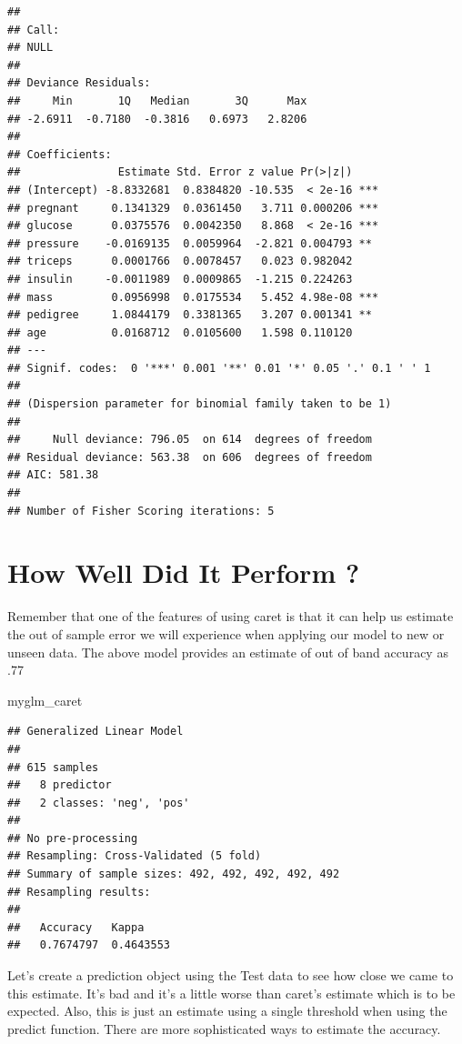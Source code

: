\documentclass[]{book}
\newenvironment{Shaded}{\begin{snugshade}}{\end{snugshade}}
\newcommand{\NormalTok}[1]{#1}
\begin{document}
\begin{verbatim}
## 
## Call:
## NULL
## 
## Deviance Residuals: 
##     Min       1Q   Median       3Q      Max  
## -2.6911  -0.7180  -0.3816   0.6973   2.8206  
## 
## Coefficients:
##               Estimate Std. Error z value Pr(>|z|)    
## (Intercept) -8.8332681  0.8384820 -10.535  < 2e-16 ***
## pregnant     0.1341329  0.0361450   3.711 0.000206 ***
## glucose      0.0375576  0.0042350   8.868  < 2e-16 ***
## pressure    -0.0169135  0.0059964  -2.821 0.004793 ** 
## triceps      0.0001766  0.0078457   0.023 0.982042    
## insulin     -0.0011989  0.0009865  -1.215 0.224263    
## mass         0.0956998  0.0175534   5.452 4.98e-08 ***
## pedigree     1.0844179  0.3381365   3.207 0.001341 ** 
## age          0.0168712  0.0105600   1.598 0.110120    
## ---
## Signif. codes:  0 '***' 0.001 '**' 0.01 '*' 0.05 '.' 0.1 ' ' 1
## 
## (Dispersion parameter for binomial family taken to be 1)
## 
##     Null deviance: 796.05  on 614  degrees of freedom
## Residual deviance: 563.38  on 606  degrees of freedom
## AIC: 581.38
## 
## Number of Fisher Scoring iterations: 5
\end{verbatim}

\section{How Well Did It Perform ?}\label{how-well-did-it-perform}

Remember that one of the features of using caret is that it can help us
estimate the out of sample error we will experience when applying our
model to new or unseen data. The above model provides an estimate of out
of band accuracy as .77

\begin{Shaded}
\begin{Highlighting}[]
\NormalTok{myglm_caret}
\end{Highlighting}
\end{Shaded}

\begin{verbatim}
## Generalized Linear Model 
## 
## 615 samples
##   8 predictor
##   2 classes: 'neg', 'pos' 
## 
## No pre-processing
## Resampling: Cross-Validated (5 fold) 
## Summary of sample sizes: 492, 492, 492, 492, 492 
## Resampling results:
## 
##   Accuracy   Kappa    
##   0.7674797  0.4643553
\end{verbatim}

Let's create a prediction object using the Test data to see how close we
came to this estimate. It's bad and it's a little worse than caret's
estimate which is to be expected. Also, this is just an estimate using a
single threshold when using the predict function. There are more
sophisticated ways to estimate the accuracy.
\end{document}
